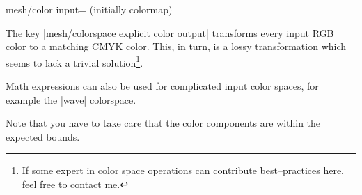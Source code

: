 {{\begin{pgfplotskey}{mesh/color input= (initially colormap)}
\pgfplotsexpensiveexample
\begin{codeexample}[]
\end{codeexample}
\noindent The key |mesh/colorspace explicit color output| transforms every input RGB color to a matching CMYK color. This, in turn, is a lossy transformation which seems to lack a trivial solution\footnote{If some expert in color space operations can contribute best--practices here, feel free to contact me.}.


Math expressions can also be used for complicated input color spaces, for example the |wave| colorspace.
\begin{codeexample}[]
\end{codeexample}

Note that you have to take care that the color components are within the expected bounds.
\end{pgfplotskey}

}

}
